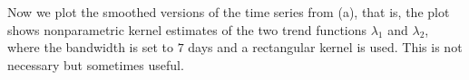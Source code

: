 \documentclass[a4paper]{scrartcl}
\begin{document}
Now we plot the smoothed versions of the time series from (a), that is, the plot shows nonparametric kernel estimates of the two trend functions $\lambda_1$ and $\lambda_2$, where the bandwidth is set to $7$ days and a rectangular kernel is used. This is not necessary but sometimes useful.
% 
% 
% 
% 
% 
% 
%     
% 
\end{document}
